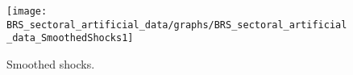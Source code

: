  
\begin{figure}[H]
\centering 
\texttt{[image: BRS\_sectoral\_artificial\_data/graphs/BRS\_sectoral\_artificial\_data\_SmoothedShocks1]}
\caption{Smoothed shocks.}\label{Fig:SmoothedShocks:1}
\end{figure}


